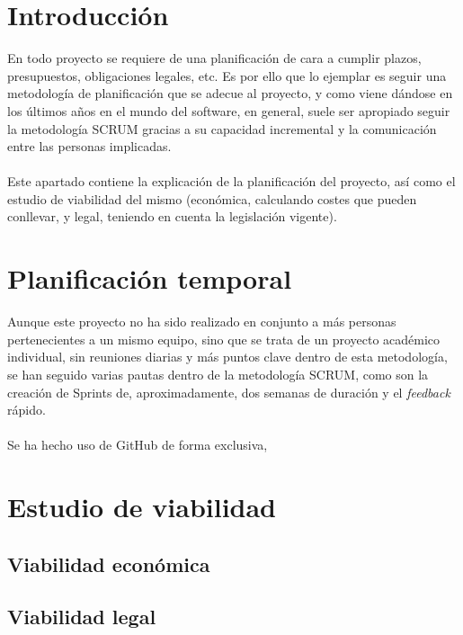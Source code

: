 
\section{Introducción}
En todo proyecto se requiere de una planificación de cara a cumplir plazos, presupuestos, obligaciones legales, etc. Es por ello que lo ejemplar es seguir una metodología de planificación que se adecue al proyecto, y como viene dándose en los últimos años en el mundo del software, en general, suele ser apropiado seguir la metodología SCRUM gracias a su capacidad incremental y la comunicación entre las personas implicadas.
\\\\
Este apartado contiene la explicación de la planificación del proyecto, así como el estudio de viabilidad del mismo (económica, calculando costes que pueden conllevar, y legal, teniendo en cuenta la legislación vigente).

\section{Planificación temporal}
Aunque este proyecto no ha sido realizado en conjunto a más personas pertenecientes a un mismo equipo, sino que se trata de un proyecto académico individual, sin reuniones diarias y más puntos clave dentro de esta metodología, se han seguido varias pautas dentro de la metodología SCRUM, como son la creación de Sprints de, aproximadamente, dos semanas de duración y el \textit{feedback} rápido. 
\\\\
Se ha hecho uso de GitHub de forma exclusiva, 
\section{Estudio de viabilidad}

\subsection{Viabilidad económica}

\subsection{Viabilidad legal}


